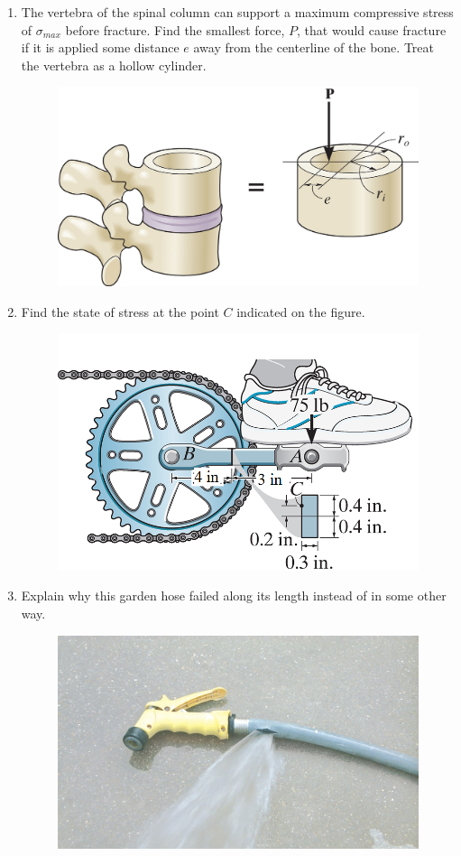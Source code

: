 \documentclass[12pt, oneside]{article}
\begin{document}
\begin{enumerate}
	\item %
		The vertebra of the spinal column can support a maximum compressive stress of $\sigma_{max}$ before fracture.
		Find the smallest force, $P$, that would cause fracture if it is applied some distance $e$ away from the centerline of the bone.
		Treat the vertebra as a hollow cylinder.
		\begin{figure}[H]
			\centering
			\includegraphics[width=0.6\linewidth]{8-52}
		\end{figure}
		\newpage

	\item %
		Find the state of stress at the point $C$ indicated on the figure.
		\begin{figure}[H]
			\centering
			\includegraphics[width=0.6\linewidth]{3-2b}
		\end{figure}

	\item %
		Explain why this garden hose failed along its length instead of in some other way.
		\begin{figure}[H]
			\centering
			\includegraphics[width=0.6\linewidth]{C8-1}
		\end{figure}
		\newpage


\end{enumerate}
\end{document}
